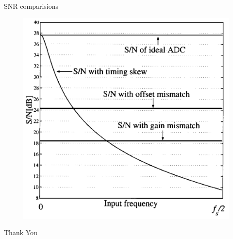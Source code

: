 \documentclass{beamer}
\begin{document}
\begin{frame}{SNR comparisions}
\begin{figure}
	\includegraphics[scale=0.25]{./figs/Over.png}
\end{figure}
\end{frame}

\begin{frame}{}
\centering
 \Huge
 Thank You
\end{frame}
\end{document}
